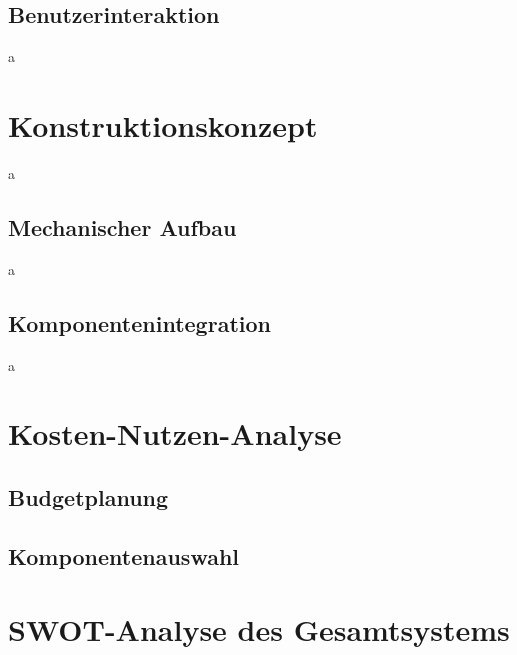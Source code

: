 \subsection{Benutzerinteraktion}
a






\section{Konstruktionskonzept}
a
\subsection{Mechanischer Aufbau}
a
\subsection{Komponentenintegration}
a

\section{Kosten-Nutzen-Analyse}
\subsection{Budgetplanung}
\subsection{Komponentenauswahl}

\section{SWOT-Analyse des Gesamtsystems}











